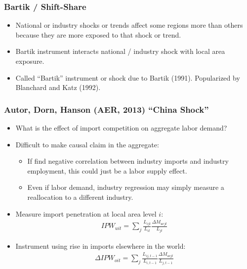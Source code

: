 \documentclass[english,xcolor=svgnames]{beamer}
\begin{document}
\begin{frame}
\frametitle[alignment=center]{Bartik / Shift-Share}
\begin{itemize}
	\item National or industry shocks or trends affect some regions more than others because they are more exposed to that shock or trend.
	\item Bartik instrument interacts national / industry shock with local area exposure.
	\item Called ``Bartik'' instrument or shock due to Bartik (1991). Popularized by Blanchard and Katz (1992).
\end{itemize}
\end{frame}

\begin{frame}
	\frametitle[alignment=center]{Autor, Dorn, Hanson (AER, 2013) ``China Shock''}
	\begin{itemize}
		\item What is the effect of import competition on aggregate labor demand?
		\item Difficult to make causal claim in the aggregate:
		\begin{itemize}
			\item If find negative correlation between industry imports and industry employment, this could just be a labor supply effect.
			\item Even if labor demand, industry regression may  simply measure a reallocation to a different industry.
		\end{itemize}
		\item Measure import penetration at local area level $i$:
		\begin{align*}
			IPW_{uit} = \sum_j \frac{L_{ijt}}{L_{it}}  \frac{\Delta M_{ucjt}}{L_{jt}}
		\end{align*}
		\item Instrument using rise in imports elsewhere in the world:
		\begin{align*}
			\Delta IPW_{oit} = \sum_j \frac{L_{ij,t-1}}{L_{i,t-1}}  \frac{\Delta M_{ocjt}}{L_{j,t-1}}
		\end{align*}
	\end{itemize}
	\end{frame}
	
\end{document}
